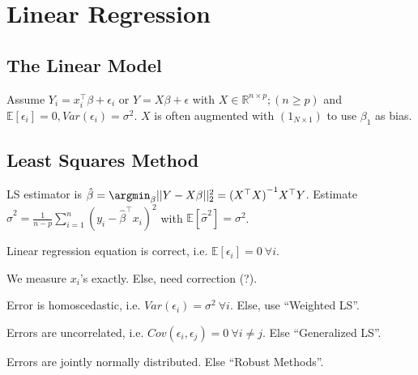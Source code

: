 \section{Linear Regression}\label{sec:multiple_linear_regression}
\subsection{The Linear Model}\label{subsec:the_linear_model}
\begin{sectionbox}\nospacing{}
  Assume $Y_i = x_{i}^{\top}\beta + \epsilon_{i}$ or $Y = X \beta + \epsilon$ with $X \in \mathbb{R}^{n \times p}; (n \geq p)$ and $\mathbb{E}[\epsilon_{i}]=0, Var(\epsilon_{i}) = \sigma^{2}$.
  $X$ is often augmented with $(1_{N\times 1})$ to use $\beta_{1}$ as bias.
\end{sectionbox}
\subsection{Least Squares Method}\label{subsec:least_squares_method}
\begin{sectionbox}\nospacing{}
  LS estimator is $\hat \beta = \argmin_{\beta} ||Y - X\beta||^{2}_{2} = {(X^{\top}X)}^{-1} X^{\top}Y $.
  Estimate $\hat{\sigma}^{2} = \frac{1}{n-p}\sum_{i=1}^{n}(y_i-\hat{\beta}^\top x_i)^{2}$ with $\mathbb{E}[\hat{\sigma}^{2}] = \sigma^{2}$.
\end{sectionbox}

\begin{notebox}\nospacing{}
  \begin{enumeratenosep}[label=\roman*]
    \item Linear regression equation is correct, i.e. $\mathbb{E}[\epsilon_{i}]=0\ \forall i$.
    \item We measure $x_{i}$'s exactly. Else, need correction (?).
    \item Error is homoscedastic, i.e. $Var(\epsilon_{i})=\sigma^{2}\ \forall i$. Else, use ``Weighted LS''.
    \item Errors are uncorrelated, i.e. $Cov(\epsilon_{i}, \epsilon_{j}) = 0\ \forall i \neq j$. Else ``Generalized LS''.
    \item Errors are jointly normally distributed. Else ``Robust Methods''.
  \end{enumeratenosep}
\end{notebox}

